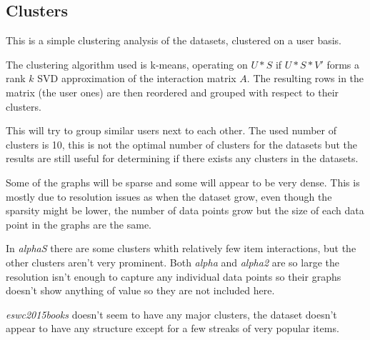 

\subsection{Clusters}\label{sec:result:clusters}


This is a simple clustering analysis of the datasets, clustered on a user basis.

The clustering algorithm used is k-means, operating on $U * S$ if $U * S * V'$ forms a rank $k$ SVD approximation of the interaction matrix $A$. The resulting rows in the matrix (the user ones) are then reordered and grouped with respect to their clusters.

This will try to group similar users next to each other. The used number of clusters is 10, this is not the optimal number of clusters for the datasets but the results are still useful for determining if there exists any clusters in the datasets.

Some of the graphs will be sparse and some will appear to be very dense. This is mostly due to resolution issues as when the dataset grow, even though the sparsity might be lower, the number of data points grow but the size of each data point in the graphs are the same.

\FloatBarrier


In \textit{alphaS} there are some clusters whith relatively few item interactions, but the other clusters aren't very prominent. Both \textit{alpha} and \textit{alpha2} are so large the resolution isn't enough to capture any individual data points so their graphs doesn't show anything of value so they are not included here.


\FloatBarrier

\textit{eswc2015books} doesn't seem to have any major clusters, the dataset doesn't appear to have any structure except for a few streaks of very popular items.

\FloatBarrier



